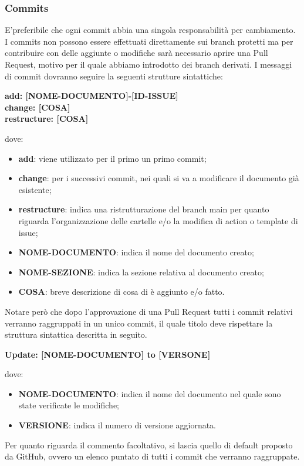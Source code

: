         \subsubsection{Commits}\label{inf:comm}
        E'preferibile che ogni commit abbia una singola responsabilità per cambiamento.
        I commits non possono essere effettuati direttamente sui branch protetti ma per contribuire con delle aggiunte o
        modifiche sarà necessario aprire una Pull Request, motivo per il quale abbiamo introdotto dei branch derivati.
        I messaggi di commit dovranno seguire la seguenti strutture sintattiche:
        \begin{center}
            \textbf{add: [NOME-DOCUMENTO]-[ID-ISSUE]\\
            change: [COSA]\\
            restructure: [COSA]}
        \end{center}
        dove: 
        \begin{itemize}
            \item \textbf{add}: viene utilizzato per il primo un primo commit;
            \item \textbf{change}: per i successivi commit, nei quali si va a modificare il documento già esistente;
            \item \textbf{restructure}: indica una ristrutturazione del branch main per quanto riguarda l'organizzazione delle cartelle e/o la modifica di action o template di issue;
            \item \textbf{NOME-DOCUMENTO}: indica il nome del documento creato;
            \item \textbf{NOME-SEZIONE}: indica la sezione relativa al documento creato;
            \item \textbf{COSA}: breve descrizione di cosa di è aggiunto e/o fatto.
        \end{itemize}

        Notare però che dopo l'approvazione di una Pull Request tutti i commit
        relativi verranno raggruppati in un unico commit, il quale titolo deve rispettare la struttura sintattica descritta in
        seguito.
        \begin{center}
            \textbf{Update: [NOME-DOCUMENTO] to [VERSONE]}
        \end{center}
        dove:

        \begin{itemize}
            \item \textbf{NOME-DOCUMENTO}: indica il nome del documento nel quale sono state verificate le modifiche;
            \item \textbf{VERSIONE}: indica il numero di versione aggiornata.
        \end{itemize}
        Per quanto riguarda il commento facoltativo, si lascia quello di default proposto da GitHub, ovvero un elenco puntato di tutti i commit che verranno raggruppate.\\
        

